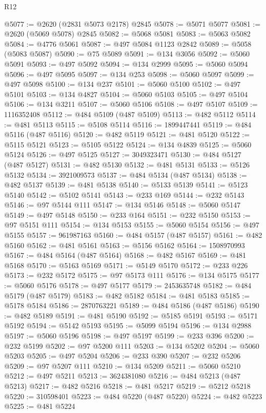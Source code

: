 \begin{lexlean}{R12}
\begin{coremodule}
{{{{{{{{{{{{{{{{{{{{{{{{{{{{{{{{{{{{{{{{{{{{{{{{{{{{{{{{{{{{{{{{{{{{{{{{{{{{{{{{{{@5077 := @2620 (@2831 @5073 @2178) @2845
@5078 := @5071 @5077
@5081 := @2620 (@5069 @5078) @2845
@5082 := @5068 @5081
@5083 := @5063 @5082
@5084 := @4776 @5061
@5087 := @497 @5084 @1123 @2842
@5089 := @5058 (@5083 @5087)
@5090 := @75 @5089
@5091 := @134 @3056
@5092 := @5060 @5091
@5093 := @497 @5092
@5094 := @134 @2999
@5095 := @5060 @5094
@5096 := @497 @5095
@5097 := @134 @253
@5098 := @5060 @5097
@5099 := @497 @5098
@5100 := @134 @237
@5101 := @5060 @5100
@5102 := @497 @5101
@5103 := @134 @4827
@5104 := @5060 @5103
@5105 := @497 @5104
@5106 := @134 @3211
@5107 := @5060 @5106
@5108 := @497 @5107
@5109 := 1116352408
@5112 := @484 @5109 (@487 @5109)
@5113 := @482 @5112
@5114 := @481 @5113
@5115 := @5108 @5114
@5116 := 1899447441
@5119 := @484 @5116 (@487 @5116)
@5120 := @482 @5119
@5121 := @481 @5120
@5122 := @5115 @5121
@5123 := @5105 @5122
@5124 := @134 @4839
@5125 := @5060 @5124
@5126 := @497 @5125
@5127 := 3049323471
@5130 := @484 @5127 (@487 @5127)
@5131 := @482 @5130
@5132 := @481 @5131
@5133 := @5126 @5132
@5134 := 3921009573
@5137 := @484 @5134 (@487 @5134)
@5138 := @482 @5137
@5139 := @481 @5138
@5140 := @5133 @5139
@5141 := @5123 @5140
@5142 := @5102 @5141
@5143 := @233 @169
@5144 := @232 @5143
@5146 := @97 @5144 @111
@5147 := @134 @5146
@5148 := @5060 @5147
@5149 := @497 @5148
@5150 := @233 @164
@5151 := @232 @5150
@5153 := @97 @5151 @111
@5154 := @134 @5153
@5155 := @5060 @5154
@5156 := @497 @5155
@5157 := 961987163
@5160 := @484 @5157 (@487 @5157)
@5161 := @482 @5160
@5162 := @481 @5161
@5163 := @5156 @5162
@5164 := 1508970993
@5167 := @484 @5164 (@487 @5164)
@5168 := @482 @5167
@5169 := @481 @5168
@5170 := @5163 @5169
@5171 := @5149 @5170
@5172 := @233 @226
@5173 := @232 @5172
@5175 := @97 @5173 @111
@5176 := @134 @5175
@5177 := @5060 @5176
@5178 := @497 @5177
@5179 := 2453635748
@5182 := @484 @5179 (@487 @5179)
@5183 := @482 @5182
@5184 := @481 @5183
@5185 := @5178 @5184
@5186 := 2870763221
@5189 := @484 @5186 (@487 @5186)
@5190 := @482 @5189
@5191 := @481 @5190
@5192 := @5185 @5191
@5193 := @5171 @5192
@5194 := @5142 @5193
@5195 := @5099 @5194
@5196 := @134 @2988
@5197 := @5060 @5196
@5198 := @497 @5197
@5199 := @233 @396
@5200 := @232 @5199
@5202 := @97 @5200 @111
@5203 := @134 @5202
@5204 := @5060 @5203
@5205 := @497 @5204
@5206 := @233 @390
@5207 := @232 @5206
@5209 := @97 @5207 @111
@5210 := @134 @5209
@5211 := @5060 @5210
@5212 := @497 @5211
@5213 := 3624381080
@5216 := @484 @5213 (@487 @5213)
@5217 := @482 @5216
@5218 := @481 @5217
@5219 := @5212 @5218
@5220 := 310598401
@5223 := @484 @5220 (@487 @5220)
@5224 := @482 @5223
@5225 := @481 @5224
}}}}}}}}}}}}}}}}}}}}}}}}}}}}}}}}}}}}}}}}}}}}}}}}}}}}}}}}}}}}}}}}}}}}}}}}}}}}}}}}}}
\end{coremodule}
\end{lexlean}

